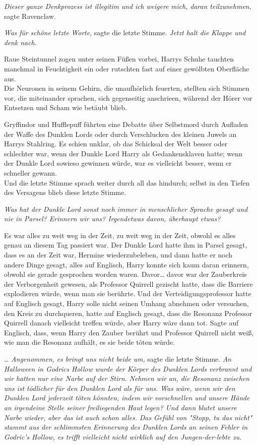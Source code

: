 {\emph{Dieser ganze Denkprozess ist illegitim und ich weigere mich, daran teilzunehmen,} sagte Ravenclaw.

\emph{Was für schöne letzte Worte,} sagte die letzte Stimme. \emph{Jetzt halt die Klappe und denk nach.}

Raue Steintunnel zogen unter seinen Füßen vorbei, Harrys Schuhe tauchten manchmal in Feuchtigkeit ein oder rutschten fast auf einer gewölbten Oberfläche aus.\\ Die Neuronen in seinem Gehirn, die unaufhörlich feuerten, stellten sich Stimmen vor, die miteinander sprachen, sich gegenseitig anschrieen, während der Hörer vor Entsetzen und Scham wie betäubt blieb.

Gryffindor und Hufflepuff führten eine Debatte über Selbstmord durch Aufladen der Waffe des Dunklen Lords oder durch Verschlucken des kleinen Juwels an Harrys Stahlring. Es schien unklar, ob das Schicksal der Welt besser oder schlechter war, wenn der Dunkle Lord Harry als Gedankensklaven hatte; wenn der Dunkle Lord sowieso gewinnen würde, war es vielleicht besser, wenn er schneller gewann.\\ Und die letzte Stimme sprach weiter durch all das hindurch; selbst in den Tiefen des Versagens blieb diese letzte Stimme.

\emph{Was hat der Dunkle Lord sonst noch immer in menschlicher Sprache gesagt und nie in Parsel? Erinnern wir uns? Irgendetwas davon, überhaupt etwas?}

Es war alles zu weit weg in der Zeit, zu weit weg in der Zeit, obwohl es alles genau an diesem Tag passiert war. Der Dunkle Lord hatte ihm in Parsel gesagt, dass es an der Zeit war, Hermine wiederzubeleben, und dann hatte er noch andere Dinge gesagt, alles auf Englisch, Harry konnte sich kaum daran erinnern, obwohl sie gerade gesprochen worden waren. Davor… davor war der Zauberkreis der Verborgenheit gewesen, als Professor Quirrell gezischt hatte, dass die Barriere explodieren würde, wenn man sie berührte. Und der Verteidigungsprofessor hatte auf Englisch gesagt, Harry solle nicht seinen Umhang abnehmen oder versuchen, den Kreis zu durchqueren, hatte auf Englisch gesagt, dass die Resonanz Professor Quirrell danach vielleicht treffen würde, aber Harry wäre dann tot. Sagte auf Englisch, dass, wenn Harry den Zauber berührt und Professor Quirrell nicht weiß, wie man die Resonanz aufhält, es sie beide töten würde.

\emph{… Angenommen, es bringt uns nicht beide um,} sagte die letzte Stimme. \emph{An Halloween in Godrics Hollow wurde der Körper des Dunklen Lords verbrannt und wir hatten nur eine Narbe auf der Stirn. Nehmen wir an, die Resonanz zwischen uns ist tödlicher für den Dunklen Lord als für uns. Was wäre, wenn wir den Dunklen Lord jederzeit töten könnten, indem wir vorschnellen und unsere Hände an irgendeine Stelle seiner freiliegenden Haut legen? Und dann blutet unsere Narbe wieder, aber das ist auch schon alles. Das Gefühl von "Stopp, tu das nicht" stammt aus der schlimmsten Erinnerung des Dunklen Lords an seinen Fehler in Godric's Hollow, es trifft vielleicht nicht wirklich auf den Jungen-der-lebte zu.}

}
